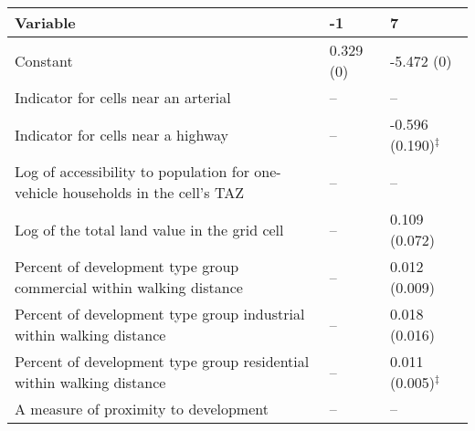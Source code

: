
\begin{tabular}{p{3in}p{0.5in}p{0.5in}}
\hline\hline
Variable & -1 & 7 \\\hline
Constant & 0.329 (0) & -5.472 (0) \\
Indicator for cells near an arterial & -- & -- \\
Indicator for cells near a highway & -- & -0.596 (0.190)$^{\ddagger}$ \\
Log of accessibility to population for one-vehicle households in the cell's TAZ & -- & -- \\
Log of the total land value in the grid cell & -- & 0.109 (0.072) \\
Percent of development type group commercial within walking distance & -- & 0.012 (0.009) \\
Percent of development type group industrial within walking distance & -- & 0.018 (0.016) \\
Percent of development type group residential within walking distance & -- & 0.011 (0.005)$^{\ddagger}$ \\
A measure of proximity to development & -- & -- \\
\hline\hline
\end{tabular}
